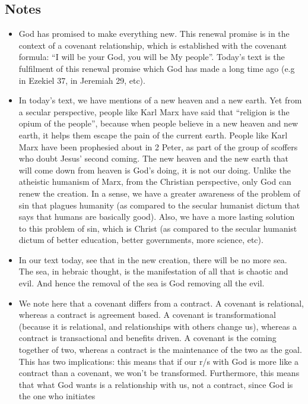 \subsection*{Notes}
\begin{itemize}
  \item{God has promised to make everything new. This renewal promise is in
  the context of a covenant relationship, which is established with the
  covenant formula: ``I will be your God, you will be My people''. Today's
  text is the fulfilment of this renewal promise which God has made a long
  time ago (e.g in Ezekiel 37, in Jeremiah 29, etc).}
  \item{In today's text, we have mentions of a new heaven and a new earth.
  Yet from a secular perspective, people like Karl Marx have said that
  ``religion is the opium of the people'', because when people believe in a
  new heaven and new earth, it helps them escape the pain of the current
  earth. People like Karl Marx have been prophesied about in 2 Peter, as part
  of the group of scoffers who doubt Jesus' second coming. The new heaven and
  the new earth that will come down from heaven is God's doing, it is not our
  doing. Unlike the atheistic humanism of Marx, from the Christian
  perspective, only God can renew the creation. In a sense, we have a greater
  awareness of the problem of sin that plagues humanity (as compared to the
  secular humanist dictum that says that humans are basically good). Also, we
  have a more lasting solution to this problem of sin, which is Christ (as
  compared to the secular humanist dictum of better education, better
  governments, more science, etc).}
  \item{In our text today, see that in the new creation, there will be no
  more sea. The sea, in hebraic thought, is the manifestation of all that is
  chaotic and evil. And hence the removal of the sea is God removing all the evil.}
  \item{We note here that a covenant differs from a contract. A covenant is
  relational, whereas a contract is agreement based. A covenant is
  transformational (because it is relational, and relationships with others
  change us), whereas a contract is transactional and benefits driven. A
  covenant is the coming together of two, whereas a contract is the
  maintenance of the two as the goal. This has two implications: this means
  that if our r/s with God is more like a contract than a covenant, we won't
  be transformed. Furthermore, this means that what God wants is a
  relationship with us, not a contract, since God is the one who initiates
}
\end{itemize}
